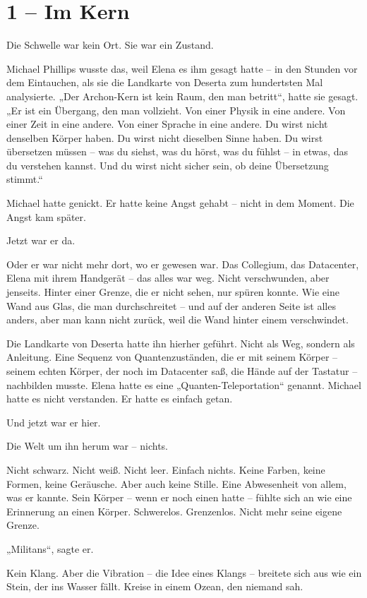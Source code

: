 \documentclass[
]{article}
\begin{document}
\section{1 -- Im Kern}\label{im-kern}

Die Schwelle war kein Ort. Sie war ein Zustand.

Michael Phillips wusste das, weil Elena es ihm gesagt hatte -- in den Stunden vor dem Eintauchen, als sie die Landkarte von Deserta zum hundertsten Mal analysierte. „Der Archon-Kern ist kein Raum, den man betritt``, hatte sie gesagt. „Er ist ein Übergang, den man vollzieht. Von einer Physik in eine andere. Von einer Zeit in eine andere. Von einer Sprache in eine andere. Du wirst nicht denselben Körper haben. Du wirst nicht dieselben Sinne haben. Du wirst übersetzen müssen -- was du siehst, was du hörst, was du fühlst -- in etwas, das du verstehen kannst. Und du wirst nicht sicher sein, ob deine Übersetzung stimmt.``

Michael hatte genickt. Er hatte keine Angst gehabt -- nicht in dem Moment. Die Angst kam später.

Jetzt war er da.

Oder er war nicht mehr dort, wo er gewesen war. Das Collegium, das Datacenter, Elena mit ihrem Handgerät -- das alles war weg. Nicht verschwunden, aber jenseits. Hinter einer Grenze, die er nicht sehen, nur spüren konnte. Wie eine Wand aus Glas, die man durchschreitet -- und auf der anderen Seite ist alles anders, aber man kann nicht zurück, weil die Wand hinter einem verschwindet.

Die Landkarte von Deserta hatte ihn hierher geführt. Nicht als Weg, sondern als Anleitung. Eine Sequenz von Quantenzuständen, die er mit seinem Körper -- seinem echten Körper, der noch im Datacenter saß, die Hände auf der Tastatur -- nachbilden musste. Elena hatte es eine „Quanten-Teleportation`` genannt. Michael hatte es nicht verstanden. Er hatte es einfach getan.

Und jetzt war er hier.

Die Welt um ihn herum war -- nichts.

Nicht schwarz. Nicht weiß. Nicht leer. Einfach nichts. Keine Farben, keine Formen, keine Geräusche. Aber auch keine Stille. Eine Abwesenheit von allem, was er kannte. Sein Körper -- wenn er noch einen hatte -- fühlte sich an wie eine Erinnerung an einen Körper. Schwerelos. Grenzenlos. Nicht mehr seine eigene Grenze.

„Militans``, sagte er.

Kein Klang. Aber die Vibration -- die Idee eines Klangs -- breitete sich aus wie ein Stein, der ins Wasser fällt. Kreise in einem Ozean, den niemand sah.
\end{document}
